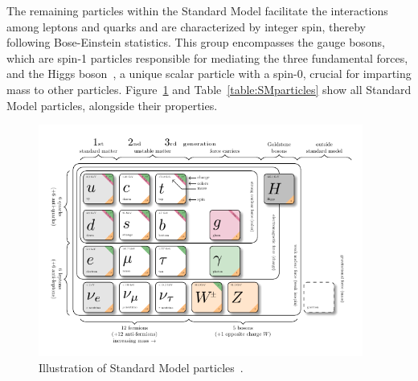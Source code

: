 The remaining particles within the Standard Model facilitate the interactions among leptons and quarks and are characterized by integer spin, thereby following Bose-Einstein statistics. This group encompasses the gauge bosons, which are spin-1 particles responsible for mediating the three fundamental forces, and the Higgs boson~\cite{Higgs:1964ia}, a unique scalar particle with a spin-0, crucial for imparting mass to other particles. 
Figure~\ref{fig:stdm_higgs} and Table~\ref{table:SMparticles} show all Standard Model particles, alongside their properties.


\begin{figure}[ht]
    \centering
    \includegraphics[width=0.95\textwidth]{figures/theory/model-physics.pdf}
    \caption{Illustration of Standard Model particles~\cite{Burgard2019}.}
    \label{fig:stdm_higgs}
\end{figure}


